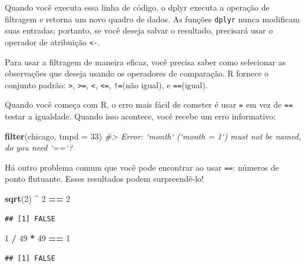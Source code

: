 \documentclass[]{book}
\newenvironment{Shaded}{\begin{snugshade}}{\end{snugshade}}
\newcommand{\CommentTok}[1]{\textcolor[rgb]{0.56,0.35,0.01}{\textit{#1}}}
\newcommand{\DataTypeTok}[1]{\textcolor[rgb]{0.13,0.29,0.53}{#1}}
\newcommand{\DecValTok}[1]{\textcolor[rgb]{0.00,0.00,0.81}{#1}}
\newcommand{\KeywordTok}[1]{\textcolor[rgb]{0.13,0.29,0.53}{\textbf{#1}}}
\newcommand{\NormalTok}[1]{#1}
\newcommand{\OperatorTok}[1]{\textcolor[rgb]{0.81,0.36,0.00}{\textbf{#1}}}
\newcommand{\StringTok}[1]{\textcolor[rgb]{0.31,0.60,0.02}{#1}}
\begin{document}
Quando você executa essa linha de código, o dplyr executa a operação de filtragem e retorna um novo quadro de dados. As funções \texttt{dplyr} nunca modificam suas entradas; portanto, se você deseja salvar o resultado, precisará usar o operador de atribuição \texttt{\textless{}-}.

Para usar a filtragem de maneira eficaz, você precisa saber como selecionar as observações que deseja usando os operadores de comparação. R fornece o conjunto padrão: \texttt{\textgreater{}}, \texttt{\textgreater{}=}, \texttt{\textless{}}, \texttt{\textless{}=}, \texttt{!=}(não igual), e \texttt{==}(igual).

Quando você começa com R, o erro mais fácil de cometer é usar \texttt{=} em vez de \texttt{==} testar a igualdade. Quando isso acontece, você recebe um erro informativo:

\begin{Shaded}
\begin{Highlighting}[]
\KeywordTok{filter}\NormalTok{(chicago, }\DataTypeTok{tmpd =} \DecValTok{33}\NormalTok{)}
\CommentTok{#> Error: `month` (`month = 1`) must not be named, do you need `==`?}
\end{Highlighting}
\end{Shaded}

Há outro problema comum que você pode encontrar ao usar \texttt{==}: números de ponto flutuante. Esses resultados podem surpreendê-lo!

\begin{Shaded}
\begin{Highlighting}[]
\KeywordTok{sqrt}\NormalTok{(}\DecValTok{2}\NormalTok{) }\OperatorTok{^}\StringTok{ }\DecValTok{2} \OperatorTok{==}\StringTok{ }\DecValTok{2}
\end{Highlighting}
\end{Shaded}

\begin{verbatim}
## [1] FALSE
\end{verbatim}

\begin{Shaded}
\begin{Highlighting}[]
\DecValTok{1} \OperatorTok{/}\StringTok{ }\DecValTok{49} \OperatorTok{*}\StringTok{ }\DecValTok{49} \OperatorTok{==}\StringTok{ }\DecValTok{1}
\end{Highlighting}
\end{Shaded}

\begin{verbatim}
## [1] FALSE
\end{verbatim}
\end{document}
